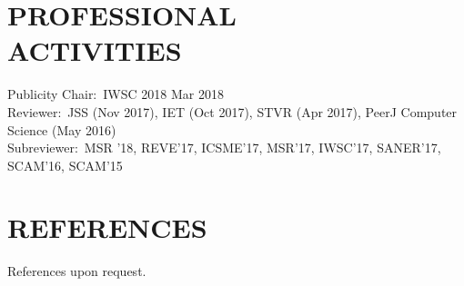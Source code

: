 \documentclass[margin, 10pt]{res} %
\begin{document}
\begin{resume}
\section{PROFESSIONAL \\ ACTIVITIES} 
Publicity Chair:~IWSC 2018 \hfill Mar 2018 \\
Reviewer:~JSS (Nov 2017), IET (Oct 2017), STVR (Apr 2017), PeerJ Computer Science (May 2016) \\
Subreviewer:~MSR '18, REVE'17, ICSME'17, MSR'17, IWSC'17, SANER'17, SCAM'16, SCAM'15



\section{REFERENCES} 

References upon request.

\end{resume}
\end{document}

